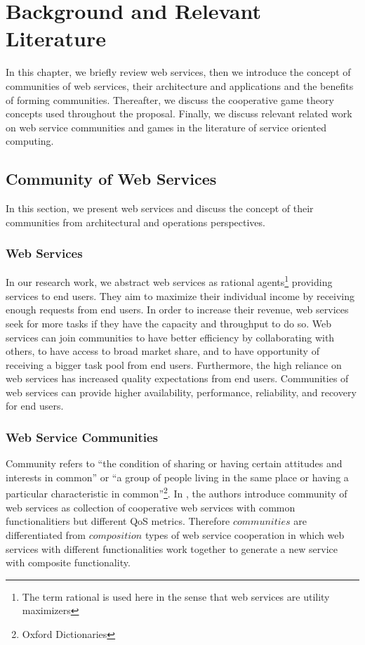 \setcounter{chapter}{1}

\chapter{Background and Relevant Literature}\label{sec:MAS}

In this chapter, we briefly review web services, then we introduce
the concept of communities of web services, their architecture and
applications and the benefits of forming communities. Thereafter,
we discuss the cooperative game theory concepts used throughout
the proposal. Finally, we discuss relevant related work on web
service communities and games in the literature of service
oriented computing.

\section{Community of Web Services}\label{sec:CommunityWS}
In this section, we present web services and discuss the concept
of their communities from architectural and operations
perspectives.

\subsection{Web Services}\label{sec:CWSWebServices}

In our research work, we abstract web services as rational
agents\footnote{The term
        rational is used here in the sense that web services are utility
        maximizers} providing services to end users. They aim to maximize
        their individual income by receiving enough requests from end
        users. In order to increase their revenue, web services seek for
        more tasks if they have the capacity and throughput to do so. Web
        services can join communities to have better efficiency by
        collaborating with others, to have access to broad market share,
        and to have opportunity of receiving a bigger task pool from end
        users. Furthermore, the high reliance on web services has increased quality expectations from end users.
        Communities of web services can provide higher availability, performance, reliability, and recovery for end users.

\subsection{Web Service Communities}\label{sec:CWSDefinition}
Community refers to ``the condition of sharing or having certain
attitudes and interests in common'' or ``a group of people living
in the same place or having a particular characteristic in
common''\footnote{Oxford Dictionaries}. In
\cite{DBLP:journals/internet/BenatallahSD03,
Zeng:2003:QDW:775152.775211}, the authors introduce community of
web services as collection of cooperative web services with common
functionalitiers but different QoS metrics. Therefore
$communities$ are differentiated from $composition$ types of web
service cooperation in which web services with different
functionalities work together to generate a new service with
composite functionality.


